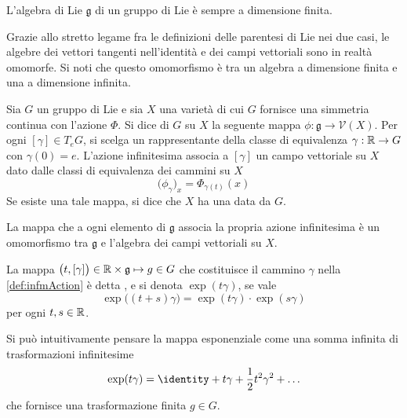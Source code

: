\begin{theorem}
  L'algebra di Lie $\mathfrak{g}$ di un gruppo di Lie è sempre a dimensione finita.
\end{theorem}

Grazie allo stretto legame fra le definizioni delle parentesi di Lie nei due casi, le algebre dei vettori tangenti nell'identità e dei campi vettoriali sono in realtà omomorfe. Si noti che questo omomorfismo è tra un algebra a dimensione finita e una a dimensione infinita.

\begin{definition} \label{def:infmAction}
  Sia $G$ un gruppo di Lie e sia $X$ una varietà di cui $G$ fornisce una simmetria continua con l'azione $\Phi$. Si dice  di $G$ su $X$ la seguente mappa $\phi: \mathfrak{g} \to \mathcal{V}(X)$. Per ogni $[\gamma] \in T_e G$, si scelga un rappresentante della classe di equivalenza $\gamma:\mathbb{R}\to G$ con $\gamma(0) = e$. L'azione infinitesima associa a $[\gamma]$ un campo vettoriale su $X$ dato dalle classi di equivalenza dei cammini su $X$
  \begin{equation*}
  \big(\phi_{\gamma}\big)_x = \Phi_{\gamma(t)} (x)
  \end{equation*}
  Se esiste una tale mappa, si dice che $X$ ha una  data da $G$.
\end{definition}
\begin{theorem}
  La mappa che a ogni elemento di $\mathfrak{g}$ associa la propria azione infinitesima è un omomorfismo tra $\mathfrak{g}$ e l'algebra dei campi vettoriali su $X$.
\end{theorem}
\begin{definition}
  La mappa $\big(t, [\gamma]\big) \in \mathbb{R} \times  \mathfrak{g} \mapsto g \in G$ che costituisce il cammino $\gamma$ nella \autoref{def:infmAction} è detta , e si denota $\exp(t \gamma)$, se vale 
  \begin{equation*}
    \exp\big((t+s) \gamma\big) = \exp(t \gamma) \cdot  \exp (s \gamma)
  \end{equation*} 
  per ogni $t,s \in \mathbb{R}$.
\end{definition}
\begin{remark}
  Si può intuitivamente pensare la mappa esponenziale come una somma infinita di trasformazioni infinitesime
  \begin{equation*}
  \exp(t \gamma) = \identity + t \gamma + \frac{1}{2} t^2 \gamma^2 + \ldots
  \end{equation*} 
  che fornisce una trasformazione finita $g \in G$.
\end{remark} 

